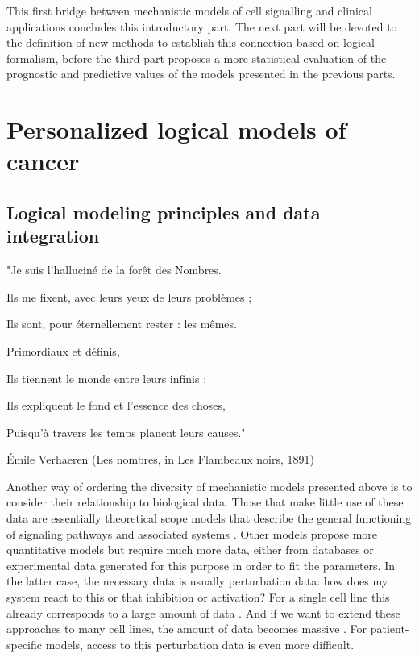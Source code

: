 \documentclass[a4paper,12pt,twoside,onecolumn,openright,final,oldfontcommands]{memoir}
\newcommand{\initial}[1]{
	\lettrine[lines=3,lhang=0.33,nindent=0em]{
		\color{gray}
     		{\textsc{#1}}}{}}
\begin{document}
This first bridge between mechanistic models of cell signalling and
clinical applications concludes this introductory part. The next part
will be devoted to the definition of new methods to establish this
connection based on logical formalism, before the third part proposes a
more statistical evaluation of the prognostic and predictive values of
the models presented in the previous parts.

\part{Personalized logical models of
cancer}\label{part-personalized-logical-models-of-cancer}

\chapter{Logical modeling principles and data
integration}\label{logical-modeling-principles-and-data-integration}

\epigraph{"Je suis l’halluciné de la forêt des Nombres.

Ils me fixent, avec leurs yeux de leurs problèmes ;

Ils sont, pour éternellement rester : les mêmes.

Primordiaux et définis,

Ils tiennent le monde entre leurs infinis ;

Ils expliquent le fond et l’essence des choses,

Puisqu’à travers les temps planent leurs causes."}{Émile Verhaeren (Les nombres, in Les Flambeaux noirs, 1891)}

\initial{A}nother way of ordering the diversity of mechanistic models
presented above is to consider their relationship to biological data.
Those that make little use of these data are essentially theoretical
scope models that describe the general functioning of signaling pathways
and associated systems \citep{calzone2010mathematical}. Other models
propose more quantitative models but require much more data, either from
databases or experimental data generated for this purpose in order to
fit the parameters. In the latter case, the necessary data is usually
perturbation data: how does my system react to this or that inhibition
or activation? For a single cell line this already corresponds to a
large amount of data \citep{razzaq2018computational}. And if we want to
extend these approaches to many cell lines, the amount of data becomes
massive \citep{frohlich2018efficient}. For patient-specific models,
access to this perturbation data is even more difficult.
\end{document}
